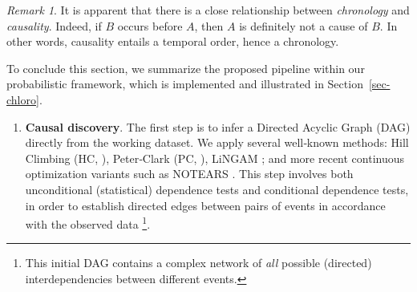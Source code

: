 \documentclass[
]{article}
\providecommand{\tightlist}{%
  \setlength{\itemsep}{0pt}\setlength{\parskip}{0pt}}\usepackage{longtable,booktabs,array}
\theoremstyle{definition}
\theoremstyle{remark}
\newtheorem{refremark}{Remark}[section]
\begin{document}
\begin{refremark}
It is apparent that there is a close relationship between
\emph{chronology} and \emph{causality}. Indeed, if \(B\) occurs before
\(A\), then \(A\) is definitely not a cause of \(B\). In other words,
causality entails a temporal order, hence a chronology.

\label{rem-chron_causality}

\end{refremark}

To conclude this section, we summarize the proposed pipeline within our
probabilistic framework, which is implemented and illustrated in
Section~\ref{sec-chloro}.

\begin{enumerate}
\def\labelenumi{\arabic{enumi}.}
\tightlist
\item
  \textbf{Causal discovery}. The first step is to infer a Directed
  Acyclic Graph (DAG) directly from the working dataset. We apply
  several well‑known methods: Hill Climbing (HC,
  ), Peter‑Clark (PC,
  ), LiNGAM
  ; and more recent continuous
  optimization variants such as NOTEARS
  . This step involves both
  unconditional (statistical) dependence tests and conditional
  dependence tests, in order to establish directed edges between pairs
  of events in accordance with the observed data \footnote{This initial
    DAG contains a complex network of \emph{all} possible (directed)
    interdependencies between different events.}.
\end{enumerate}
\end{document}
